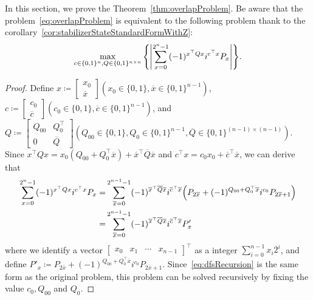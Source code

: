 \documentclass[a4paper, onecolumn, 11pt, longbibliography]{quantumarticle}
\newcommand{\defeq}{\coloneqq}
\begin{document}
In this section, we prove the Theorem~\ref{thm:overlapProblem}.
Be aware that the problem~\eqref{eq:overlapProblem}
is equivalent to the following problem thank to the corollary~\ref{cor:stabilizerStateStandardFormWithZ}:
\begin{equation*}
  \max_{c\in \{0,1\}^n, Q\in \{0,1\}^{n \times n}} \qty{ \abs{\sum_{x=0}^{2^n-1} (-1)^{x^\top Q x} i^{c^\top x} P_x} }.
\end{equation*}
\overlapProblem*
\begin{proof}
  Define $x \defeq \begin{bmatrix}
      x_0 \\
      \overline{x}
    \end{bmatrix} (x_0 \in \{0,1\}, \overline{x} \in \{0,1\}^{n-1})$,
  $c \defeq \begin{bmatrix}
      c_0 \\
      \overline{c}
    \end{bmatrix} (c_0 \in \{0,1\}, \overline{c} \in \{0,1\}^{n-1})$, and
  $Q \defeq \begin{bmatrix}
      Q_{00} & Q_{0}^\top   \\
      0      & \overline{Q}
    \end{bmatrix} (Q_{00} \in \{0,1\}, Q_0 \in \{0,1\}^{n-1}, \overline{Q} \in \{0,1\}^{(n-1) \times (n-1)})$.
  Since
  $x^\top Q x = x_0 (Q_{00}+Q_0^\top \overline{x}) + \overline{x}^\top \overline{Q} \overline{x}$
  and
  $c^\top x = c_0 x_0 + \overline{c}^\top \overline{x}$,
  we can derive that
  \begin{align}
    \sum_{x=0}^{2^n-1} (-1)^{x^\top Q x} i^{c^\top x} P_x
    = & \sum_{\overline{x}=0}^{2^{n-1}-1} (-1)^{\overline{x}^\top \overline{Q} \overline{x}} i^{\overline{c}^\top \overline{x}}
    \qty(P_{2\overline{x}} + (-1)^{Q_{00}+Q_0^\top \overline{x}} i^{c_0} P_{2\overline{x}+1})                                   \notag                       \\
    = & \sum_{\overline{x}=0}^{2^{n-1}-1} (-1)^{\overline{x}^\top \overline{Q} \overline{x}} i^{\overline{c}^\top \overline{x}} P'_x \label{eq:dfsRecursion}
  \end{align}
  where we identify a vector
  $\begin{bmatrix}
      x_0 & x_1 & \cdots & x_{n-1}
    \end{bmatrix}^\top$
  as a integer $\sum_{i=0}^{n-1} x_i 2^i$,
  and define
  $P'_x \defeq P_{2\overline{x}} + (-1)^{Q_{00}+Q_0^\top \overline{x}} i^{c_0} P_{2\overline{x}+1}$.
  Since~\eqref{eq:dfsRecursion} is the same form as the original problem, this problem can be solved recursively
  by fixing the value $c_0,Q_{00}$ and $Q_0$.


\end{proof}
\end{document}

